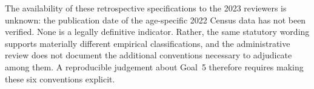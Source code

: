 The availability of these retrospective specifications to the 2023 reviewers is unknown: the publication date of the age-specific 2022 Census data has not been verified. None is a legally definitive indicator. Rather, the same statutory wording supports materially different empirical classifications, and the administrative review does not document the additional conventions necessary to adjudicate among them. A reproducible judgement about Goal~5 therefore requires making these six conventions explicit.
